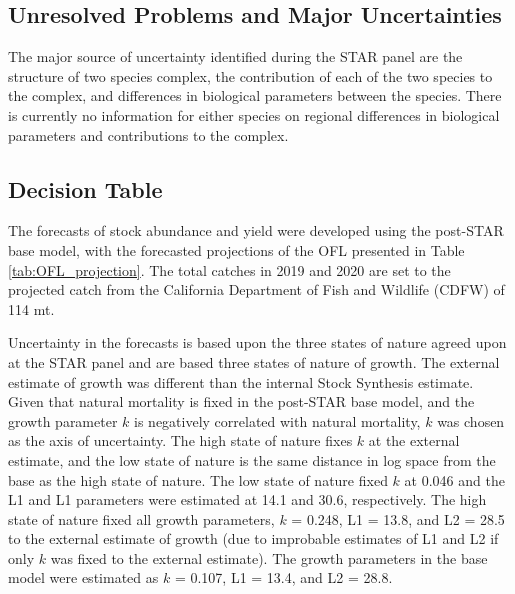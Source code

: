 \documentclass[12pt,]{article}
\begin{document}
\FloatBarrier

\subsection*{Unresolved Problems and Major
Uncertainties}\label{unresolved-problems-and-major-uncertainties}

The major source of uncertainty identified during the STAR panel are the
structure of two species complex, the contribution of each of the two
species to the complex, and differences in biological parameters between
the species. There is currently no information for either species on
regional differences in biological parameters and contributions to the
complex.

\FloatBarrier

\subsection*{Decision Table}\label{decision-table}

The forecasts of stock abundance and yield were developed using the
post-STAR base model, with the forecasted projections of the OFL
presented in Table \ref{tab:OFL_projection}. The total catches in 2019
and 2020 are set to the projected catch from the California Department
of Fish and Wildlife (CDFW) of 114 mt.

Uncertainty in the forecasts is based upon the three states of nature
agreed upon at the STAR panel and are based three states of nature of
growth. The external estimate of growth was different than the internal
Stock Synthesis estimate. Given that natural mortality is fixed in the
post-STAR base model, and the growth parameter \(k\) is negatively
correlated with natural mortality, \(k\) was chosen as the axis of
uncertainty. The high state of nature fixes \(k\) at the external
estimate, and the low state of nature is the same distance in log space
from the base as the high state of nature. The low state of nature fixed
\(k\) at 0.046 and the L1 and L1 parameters were estimated at 14.1 and
30.6, respectively. The high state of nature fixed all growth
parameters, \(k\) = 0.248, L1 = 13.8, and L2 = 28.5 to the external
estimate of growth (due to improbable estimates of L1 and L2 if only
\(k\) was fixed to the external estimate). The growth parameters in the
base model were estimated as \(k\) = 0.107, L1 = 13.4, and L2 = 28.8.
\end{document}
